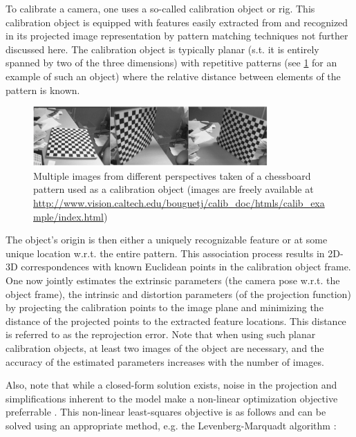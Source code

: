 \documentclass[headsepline, hidelinks, footsepline, footinclude=false, oneside, fontsize=11pt, paper=a4, listof=totoc, bibliography=totoc]{scrbook}
\begin{document}
To calibrate a camera, one uses a so-called calibration object or rig. 
This calibration object is equipped with features easily extracted from and recognized in its projected image representation by pattern matching techniques not further discussed here.
The calibration object is typically planar (s.t. it is entirely spanned by two of the three dimensions) with repetitive patterns (see \cref{fig:calib-patterns} for an example of such an object) where the relative distance between elements of the pattern is known.

\begin{figure}[htbp]
\centering
\includegraphics[width=0.8\textwidth]{figures/calib-patterns.pdf}
\caption{\label{fig:calib-patterns}Multiple images from different perspectives taken of a chessboard pattern used as a calibration object (images are freely available at \url{http://www.vision.caltech.edu/bouguetj/calib\_doc/htmls/calib\_example/index.html})}
\end{figure}

The object's origin is then either a uniquely recognizable feature or at some unique location w.r.t. the entire pattern.
This association process results in 2D-3D correspondences with known Euclidean points in the calibration object frame.
One now jointly estimates the extrinsic parameters (the camera pose w.r.t. the object frame), the intrinsic and distortion parameters (of the projection function) by projecting the calibration points to the image plane
and minimizing the distance of the projected points to the extracted feature locations. This distance is referred to as the reprojection error. 
Note that when using such planar calibration objects, at least two images of the object are necessary, and the accuracy of the estimated parameters increases with the number of images. 

Also, note that while a closed-form solution exists, noise in the projection and simplifications inherent to the model make a non-linear optimization objective preferrable \cite{zhangFlexibleNewTechnique2000}.
This non-linear least-squares objective is as follows and can be solved using an appropriate method, e.g. the Levenberg-Marquadt algorithm \cite{levenbergMethodSolutionCertain1944,marquardtAlgorithmLeastSquaresEstimation1963}: 
\end{document}

